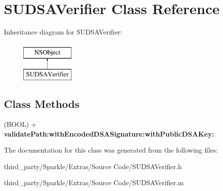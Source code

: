 \hypertarget{interface_s_u_d_s_a_verifier}{}\section{S\+U\+D\+S\+A\+Verifier Class Reference}
\label{interface_s_u_d_s_a_verifier}
Inheritance diagram for S\+U\+D\+S\+A\+Verifier\+:\begin{figure}[H]
\begin{center}
\leavevmode
\includegraphics[height=2.000000cm]{interface_s_u_d_s_a_verifier}
\end{center}
\end{figure}
\subsection*{Class Methods}
\begin{DoxyCompactItemize}
\item 
\mbox{\label{interface_s_u_d_s_a_verifier_a246eedb6cee6889fd58b301ae312f1f5}} 
(B\+O\+OL) + {\bfseries validate\+Path\+:with\+Encoded\+D\+S\+A\+Signature\+:with\+Public\+D\+S\+A\+Key\+:}
\end{DoxyCompactItemize}


The documentation for this class was generated from the following files\+:\begin{DoxyCompactItemize}
\item 
third\+\_\+party/\+Sparkle/\+Extras/\+Source Code/S\+U\+D\+S\+A\+Verifier.\+h\item 
third\+\_\+party/\+Sparkle/\+Extras/\+Source Code/S\+U\+D\+S\+A\+Verifier.\+m\end{DoxyCompactItemize}
